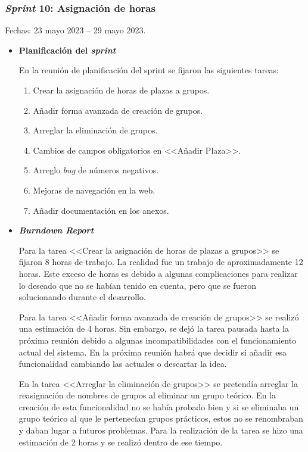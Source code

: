 \subsubsection{\textit{Sprint} 10: Asignación de horas}
Fechas: 23 mayo 2023 -- 29 mayo 2023.
\begin{itemize}
\item\textbf{Planificación del \textit{sprint}}

En la reunión de planificación del sprint se fijaron las siguientes tareas:
\begin{enumerate}
		\item Crear la asignación de horas de plazas a grupos.
		\item Añadir forma avanzada de creación de grupos.
		\item Arreglar la eliminación de grupos.
		\item Cambios de campos obligatorios en <<Añadir Plaza>>.
		\item Arreglo \textit{bug} de números negativos.
		\item Mejoras de navegación en la web.
		\item Añadir documentación en los anexos.
\end{enumerate}

\item\textbf{\textit{Burndown Report}}

Para la tarea <<Crear la asignación de horas de plazas a grupos>> se fijaron 8 horas de trabajo.
La realidad fue un trabajo de aproximadamente 12 horas.
Este exceso de horas es debido a algunas complicaciones para realizar lo deseado que no se habían tenido en cuenta, pero que se fueron solucionando durante el desarrollo.

Para la tarea <<Añadir forma avanzada de creación de grupos>> se realizó una estimación de 4 horas.
Sin embargo, se dejó la tarea pausada hasta la próxima reunión debido a algunas incompatibilidades con el funcionamiento actual del sistema.
En la próxima reunión habrá que decidir si añadir esa funcionalidad cambiando las actuales o descartar la idea.

En la tarea <<Arreglar la eliminación de grupos>> se pretendía arreglar la reasignación de nombres de grupos al eliminar un grupo teórico.
En la creación de esta funcionalidad no se había probado bien y si se eliminaba un grupo teórico al que le pertenecían grupos prácticos, estos no se renombraban y daban lugar a futuros problemas.
Para la realización de la tarea se hizo una estimación de 2 horas y se realizó dentro de ese tiempo.


\end{itemize}
